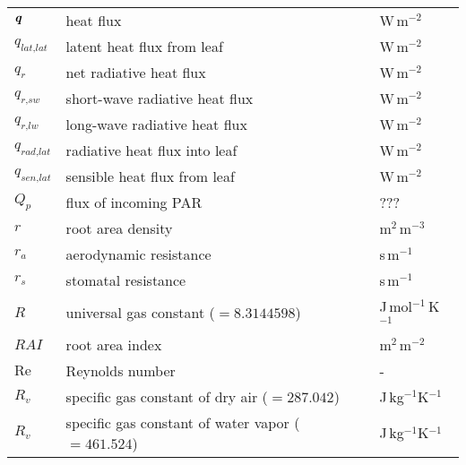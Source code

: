 \begin{longtable}{p{}p{}p{}}
	$\textbf{\textit{q}}$ & heat flux & W\,m$^{-2}$\\ 	
	$q_{\textit{lat,lat}}$ & latent heat flux from leaf & W\,m$^{-2}$\\ 	
	$q_{\textit{r}}$ & net radiative heat flux & W\,m$^{-2}$\\ 	
	$q_{\textit{r,sw}}$ & short-wave radiative heat flux & W\,m$^{-2}$\\ 	
	$q_{\textit{r,lw}}$ & long-wave radiative heat flux & W\,m$^{-2}$\\ 		
	$q_{\textit{rad,lat}}$ & radiative heat flux into leaf & W\,m$^{-2}$\\ 		
	$q_{\textit{sen,lat}}$ & sensible heat flux from leaf & W\,m$^{-2}$\\ 
	
	$Q_p$ & flux of incoming PAR & ??? \\ 
	$r$ & root area density & m$^{2}$\,m$^{-3}$ \\ 	
	$r_a$ & aerodynamic resistance & s\,m$^{-1}$\\ 
	$r_s$ & stomatal resistance & s\,m$^{-1}$\\ 	
	$R$ & universal gas constant ($=\num{8.3144598}$) & J\,mol$^{-1}$\,K$^{-1}$ \\ 
	$\textit{RAI}$ & root area index & m$^{2}$\,m$^{-2}$ \\ 	
	${\textrm{Re}}$ & Reynolds number & - \\ 
	$R_v$ & specific gas constant of dry air ($=\num{287.042}$) & J\,kg$^{-1}$K$^{-1}$ \\ 
	$R_v$ & specific gas constant of water vapor ($=\num{461.524}$) & J\,kg$^{-1}$K$^{-1}$ \\ 

\end{longtable}
